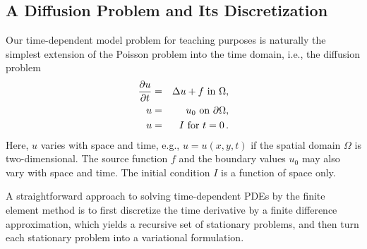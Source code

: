 \subsection{A Diffusion Problem and Its Discretization}
\label{langtangen:timedep:diffusion1}

Our time-dependent
model problem for teaching purposes is naturally the simplest
extension of the Poisson problem into the time domain, i.e., 
the diffusion problem
\begin{eqnarray}
{\partial u\over\partial t} &=& \Delta u + f \mbox{ in } \Omega, 
\label{langtangen:diffusion:pde1}\\
    u &=& u_0 \mbox{ on } \partial \Omega,
\label{langtangen:diffusion:pde1:bc}\\
    u &=& I   \mbox{ for } t=0\thinspace .
\label{langtangen:diffusion:pde1:ic}
\end{eqnarray}
Here, $u$ varies with space and time, e.g., $u=u(x,y,t)$ if the spatial
domain $\Omega$ is two-dimensional. The source function $f$ and the
boundary values $u_0$ may also vary with space and time.
The initial condition $I$ is a function of space only.

A straightforward approach to solving time-dependent
PDEs by the finite element method is to first discretize the
time derivative by a finite difference approximation, which yields
a recursive set of stationary problems, and then turn each stationary
problem into a variational formulation.

